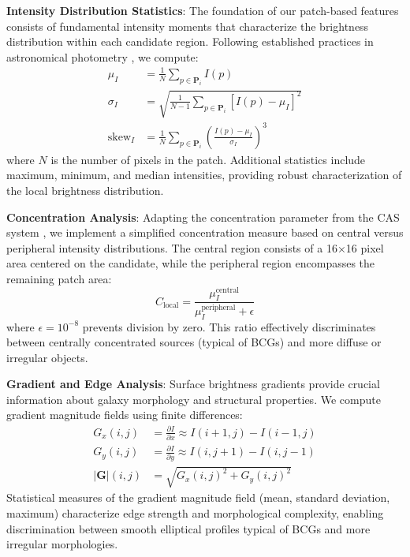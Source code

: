\documentclass[twocolumn,10pt]{aastex631}
\begin{document}
\textbf{Intensity Distribution Statistics}: The foundation of our patch-based features consists of fundamental intensity moments that characterize the brightness distribution within each candidate region. Following established practices in astronomical photometry \citep{Bertin1996}, we compute:
\begin{align}
\mu_I &= \frac{1}{N} \sum_{p \in \mathbf{P}_i} I(p) \\
\sigma_I &= \sqrt{\frac{1}{N-1} \sum_{p \in \mathbf{P}_i} [I(p) - \mu_I]^2} \\
\text{skew}_I &= \frac{1}{N} \sum_{p \in \mathbf{P}_i} \left(\frac{I(p) - \mu_I}{\sigma_I}\right)^3
\end{align}
where $N$ is the number of pixels in the patch. Additional statistics include maximum, minimum, and median intensities, providing robust characterization of the local brightness distribution.

\textbf{Concentration Analysis}: Adapting the concentration parameter from the CAS system \citep{Conselice2003}, we implement a simplified concentration measure based on central versus peripheral intensity distributions. The central region consists of a 16×16 pixel area centered on the candidate, while the peripheral region encompasses the remaining patch area:
\begin{equation}
C_{\text{local}} = \frac{\mu_I^{\text{central}}}{\mu_I^{\text{peripheral}} + \epsilon}
\end{equation}
where $\epsilon = 10^{-8}$ prevents division by zero. This ratio effectively discriminates between centrally concentrated sources (typical of BCGs) and more diffuse or irregular objects.

\textbf{Gradient and Edge Analysis}: Surface brightness gradients provide crucial information about galaxy morphology and structural properties. We compute gradient magnitude fields using finite differences:
\begin{align}
G_x(i,j) &= \frac{\partial I}{\partial x} \approx I(i+1,j) - I(i-1,j) \\
G_y(i,j) &= \frac{\partial I}{\partial y} \approx I(i,j+1) - I(i,j-1) \\
|\mathbf{G}|(i,j) &= \sqrt{G_x(i,j)^2 + G_y(i,j)^2}
\end{align}
Statistical measures of the gradient magnitude field (mean, standard deviation, maximum) characterize edge strength and morphological complexity, enabling discrimination between smooth elliptical profiles typical of BCGs and more irregular morphologies.
\end{document}
